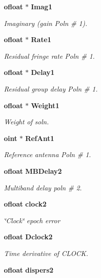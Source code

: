 \begin{CompactItemize}
{\bf ofloat} $\ast$ {\bf Imag1}
\begin{CompactList}\small\item\em Imaginary (gain Poln \# 1). \item\end{CompactList}\item 
{\bf ofloat} $\ast$ {\bf Rate1}
\begin{CompactList}\small\item\em Residual fringe rate Poln \# 1. \item\end{CompactList}\item 
{\bf ofloat} $\ast$ {\bf Delay1}
\begin{CompactList}\small\item\em Residual group delay Poln \# 1. \item\end{CompactList}\item 
{\bf ofloat} $\ast$ {\bf Weight1}
\begin{CompactList}\small\item\em Weight of soln. \item\end{CompactList}\item 
{\bf oint} $\ast$ {\bf Ref\-Ant1}
\begin{CompactList}\small\item\em Reference antenna Poln \# 1. \item\end{CompactList}\item 
{\bf ofloat} {\bf MBDelay2}
\begin{CompactList}\small\item\em Multiband delay poln \# 2. \item\end{CompactList}\item 
{\bf ofloat} {\bf clock2}
\begin{CompactList}\small\item\em \char`\"{}Clock\char`\"{} epoch error \item\end{CompactList}\item 
{\bf ofloat} {\bf Dclock2}
\begin{CompactList}\small\item\em Time derivative of CLOCK. \item\end{CompactList}\item 
{\bf ofloat} {\bf dispers2}

\end{CompactItemize}
